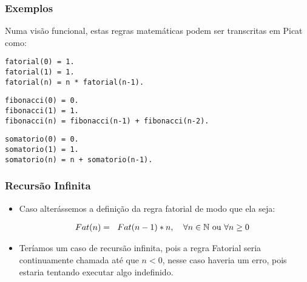 \begin{frame}[fragile]

\frametitle{Exemplos}

Numa visão funcional, estas regras matemáticas podem ser transcritas em Picat como:

    \begin{lstlisting}[frame=single]
fatorial(0) = 1.
fatorial(1) = 1.
fatorial(n) = n * fatorial(n-1).
    \end{lstlisting}

    \begin{lstlisting}[frame=single]
fibonacci(0) = 0.
fibonacci(1) = 1.
fibonacci(n) = fibonacci(n-1) + fibonacci(n-2).
    \end{lstlisting}

    \begin{lstlisting}[frame=single]
somatorio(0) = 0.
somatorio(1) = 1.
somatorio(n) = n + somatorio(n-1).
    \end{lstlisting}

\end{frame}


\begin{frame}[fragile]

\frametitle{Recursão Infinita}

    \begin{itemize}
        \item Caso alterássemos a definição da regra fatorial de modo que ela seja:
        
        \[
        Fat(n)= 
        \begin{tabular}[c]{ll}
            $Fat(n-1)\ast n$, &$\forall n \in \mathbb{N}$ ou $\forall n \geq 0$
        \end{tabular}
        \]
        
        \item Teríamos um caso de recursão infinita, pois a regra Fatorial seria continuamente
        chamada até que $n < 0$, nesse caso haveria um erro, pois estaria tentando executar algo indefinido.
        
    \end{itemize}

\end{frame}



